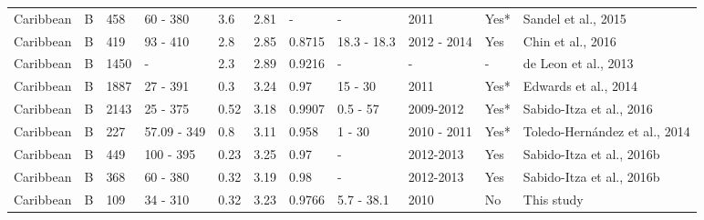 \documentclass[12pt,]{article}
\begin{document}
\begin{landscape}
\begin{table}[t]
\begin{tabular}{lllllrlllll}
Caribbean & B & 458 & 60 - 380 & 3.6 & 2.81 & - & - & 2011 & Yes* & Sandel et al., 2015\\
Caribbean & B & 419 & 93 - 410 & 2.8 & 2.85 & 0.8715 & 18.3 - 18.3 & 2012 - 2014 & Yes & Chin et al., 2016\\
Caribbean & B & 1450 & - & 2.3 & 2.89 & 0.9216 & - & - & - & de Leon et al., 2013\\
Caribbean & B & 1887 & 27 - 391 & 0.3 & 3.24 & 0.97 & 15 - 30 & 2011 & Yes* & Edwards et al., 2014\\
Caribbean & B & 2143 & 25 - 375 & 0.52 & 3.18 & 0.9907 & 0.5 - 57 & 2009-2012 & Yes* & Sabido-Itza et al., 2016\\
Caribbean & B & 227 & 57.09 - 349 & 0.8 & 3.11 & 0.958 & 1 - 30 & 2010 - 2011 & Yes* & Toledo-Hernández et al., 2014\\
Caribbean & B & 449 & 100 - 395 & 0.23 & 3.25 & 0.97 & - & 2012-2013 & Yes & Sabido-Itza et al., 2016b\\
Caribbean & B & 368 & 60 - 380 & 0.32 & 3.19 & 0.98 & - & 2012-2013 & Yes & Sabido-Itza et al., 2016b\\
Caribbean & B & 109 & 34 - 310 & 0.32 & 3.23 & 0.9766 & 5.7 - 38.1 & 2010 & No & This study\\
\bottomrule
\end{tabular}
\end{table}
\end{landscape}
\end{document}
